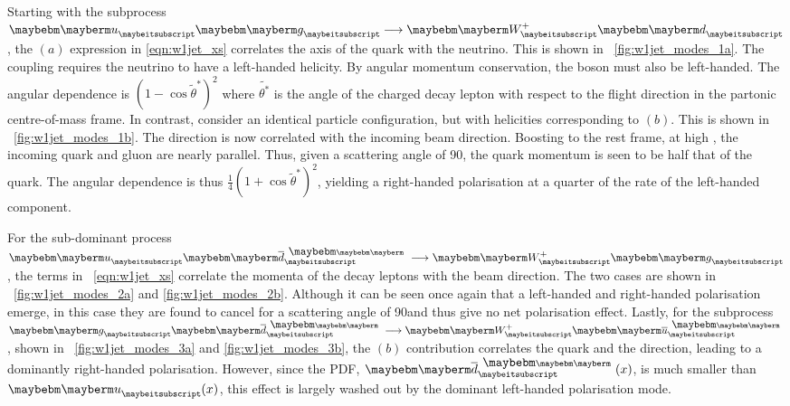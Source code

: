 Starting with the subprocess $\Pup\Pgluon\longrightarrow\PWp\Pdown$, the $(a)$
expression in \ref{eqn:w1jet_xs} correlates the axis of the \Pdown quark with
the neutrino. This is shown in \fig~\ref{fig:w1jet_modes_1a}. The \VminusA
coupling requires the neutrino to have a left-handed helicity. By angular
momentum conservation, the \PW boson must also be left-handed. The angular
dependence is $(1-\cos\tilde{\theta}^*)^2$ where $\tilde{\theta^*}$ is the angle
of the charged decay lepton with respect to the \PW flight direction in the
partonic centre-of-mass frame. In contrast, consider an identical particle configuration,
but with helicities corresponding to $(b)$. This is shown in
\fig~\ref{fig:w1jet_modes_1b}. The \Ppositron direction is now correlated with
the incoming beam direction. Boosting to the \PW rest frame, at high \PtW, the
incoming quark and gluon are nearly parallel. Thus, given a scattering angle of
90\degrees, the \Pup quark momentum is seen to be half that of the \Pdown
quark. The angular dependence is thus $\frac{1}{4}(1+\cos\tilde{\theta}^*)^2$,
yielding a right-handed polarisation at a quarter of the rate of the left-handed
component.

For the sub-dominant process $\Pup\APdown\longrightarrow\PWp\Pgluon$, the terms
in \eqn~\ref{eqn:w1jet_xs} correlate the momenta of the decay leptons with the
beam direction. The two cases are shown in \figs~\ref{fig:w1jet_modes_2a} and
\ref{fig:w1jet_modes_2b}. Although it can be seen once again that a left-handed
and right-handed polarisation emerge, in this case they are found to cancel for
a scattering angle of 90\degrees and thus give no net polarisation
effect. Lastly, for the subprocess $\Pgluon\APdown\longrightarrow\PWp\APup$,
shown in \figs~\ref{fig:w1jet_modes_3a} and \ref{fig:w1jet_modes_3b}, the $(b)$
contribution correlates the \Pup quark and the \Ppositron direction, leading to
a dominantly right-handed polarisation. However, since the \ac{PDF},
$\APdown(x)$, is much smaller than $\Pup(x)$, this effect is largely washed out
by the dominant left-handed polarisation mode.

